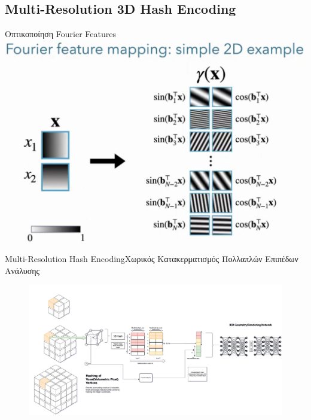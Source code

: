 \documentclass[10pt]{beamer}
\begin{document}
\subsection{Multi-Resolution 3D Hash Encoding}
\begin{frame}{Οπτικοποίηση Fourier Features}
\includegraphics[width=\textwidth]{images/FourierMapping.jpg}
\end{frame}
\begin{frame}{Multi-Resolution Hash Encoding}{Χωρικός Κατακερματισμός Πολλαπλών Επιπέδων Ανάλυσης}
    \begin{figure}
        \centering
        \includegraphics[width=1.1\textwidth]{images/IDR_Embeddings_Architecture-3D Hashgrid Embedding Net Equivalent.jpg}
    \end{figure}
\end{frame}
\end{document}
